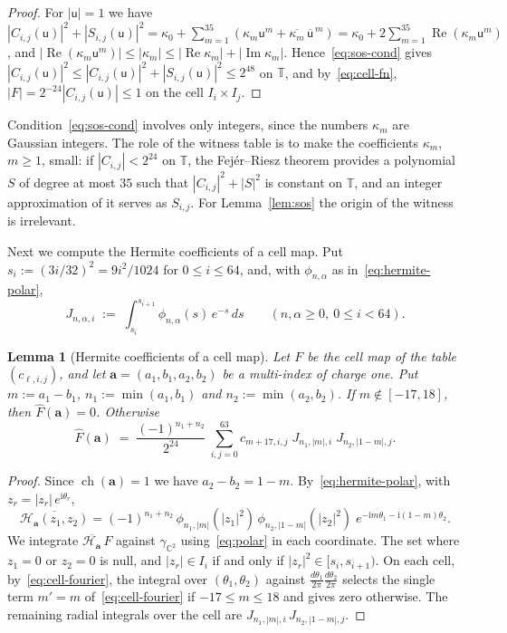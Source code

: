 \documentclass[11pt,reqno]{amsart}
\newtheorem{lemma}[theorem]{Lemma}
\theoremstyle{definition}
\numberwithin{equation}{section}
\newcommand{\C}{\mathbb{C}}
\newcommand{\T}{\mathbb{T}}
\newcommand{\ii}{\mathrm{i}}
\newcommand{\gCC}{\gamma_{\C^2}}
\DeclareMathOperator{\RePart}{Re}
\DeclareMathOperator{\ImPart}{Im}
\begin{document}
\begin{proof}
For $|\mathsf{u}|=1$ we have $|C_{i,j}(\mathsf{u})|^2 + |S_{i,j}(\mathsf{u})|^2 = \kappa_0+\sum_{m=1}^{35}(\kappa_m \mathsf{u}^m+\overline{\kappa_m}\,\overline{\mathsf{u}}^{\,m})=\kappa_0+2\sum_{m=1}^{35}\RePart(\kappa_m\mathsf{u}^m)$, and $|\RePart(\kappa_m\mathsf{u}^m)|\le|\kappa_m|\le|\RePart\kappa_m|+|\ImPart\kappa_m|$. Hence~\eqref{eq:sos-cond} gives $|C_{i,j}(\mathsf{u})|^2\le|C_{i,j}(\mathsf{u})|^2 + |S_{i,j}(\mathsf{u})|^2\le2^{48}$ on $\T$, and by~\eqref{eq:cell-fn}, $|F|=2^{-24}|C_{i,j}(\mathsf{u})|\le1$ on the cell $I_i\times I_j$.
\end{proof}

Condition~\eqref{eq:sos-cond} involves only integers, since the numbers $\kappa_m$ are Gaussian integers. The role of the witness table is to make the coefficients $\kappa_m$, $m\ge1$, small: if $|C_{i,j}|<2^{24}$ on $\T$, the Fej\'er--Riesz theorem provides a polynomial $S$ of degree at most $35$ such that $|C_{i,j}|^2+|S|^2$ is constant on $\T$, and an integer approximation of it serves as $S_{i,j}$. For Lemma~\ref{lem:sos} the origin of the witness is irrelevant.

Next we compute the Hermite coefficients of a cell map. Put $s_i:=(3i/32)^2=9i^2/1024$ for $0\le i\le64$, and, with $\phi_{n,\alpha}$ as in~\eqref{eq:hermite-polar},
\begin{equation}\label{eq:J-def}
  J_{n,\alpha,i} \;:=\; \int_{s_i}^{s_{i+1}} \phi_{n,\alpha}(s)\, e^{-s}\,ds
  \qquad (n,\alpha\ge0,\ 0\le i<64).
\end{equation}

\begin{lemma}[Hermite coefficients of a cell map]\label{lem:cell-hermite}
Let $F$ be the cell map of the table $(c_{\ell,i,j})$, and let $\mathbf{a}=(a_1,b_1,a_2,b_2)$ be a multi-index of charge one. Put $m:=a_1-b_1$, $n_1:=\min(a_1,b_1)$ and $n_2:=\min(a_2,b_2)$. If $m\notin[-17,18]$, then $\widehat{F}(\mathbf{a})=0$. Otherwise
\[
  \widehat{F}(\mathbf{a}) \;=\; \frac{(-1)^{n_1+n_2}}{2^{24}}\ \sum_{i,j=0}^{63} c_{m+17,i,j}\; J_{n_1,|m|,i}\; J_{n_2,|1-m|,j} .
\]
\end{lemma}

\begin{proof}
Since $\operatorname{ch}(\mathbf{a})=1$ we have $a_2-b_2=1-m$. By~\eqref{eq:hermite-polar}, with $z_r=|z_r|\,e^{\ii\theta_r}$,
\[
  \overline{\mathcal{H}_{\mathbf{a}}(z_1,z_2)}=(-1)^{n_1+n_2}\,\phi_{n_1,|m|}(|z_1|^2)\,\phi_{n_2,|1-m|}(|z_2|^2)\;e^{-\ii m\theta_1-\ii(1-m)\theta_2}.
\]
We integrate $\overline{\mathcal{H}_{\mathbf{a}}}\,F$ against $\gCC$ using~\eqref{eq:polar} in each coordinate. The set where $z_1=0$ or $z_2=0$ is null, and $|z_r|\in I_i$ if and only if $|z_r|^2\in[s_i,s_{i+1})$. On each cell, by~\eqref{eq:cell-fourier}, the integral over $(\theta_1,\theta_2)$ against $\frac{d\theta_1}{2\pi}\frac{d\theta_2}{2\pi}$ selects the single term $m'=m$ of~\eqref{eq:cell-fourier} if $-17\le m\le18$ and gives zero otherwise. The remaining radial integrals over the cell are $J_{n_1,|m|,i}\,J_{n_2,|1-m|,j}$.
\end{proof}
\end{document}

